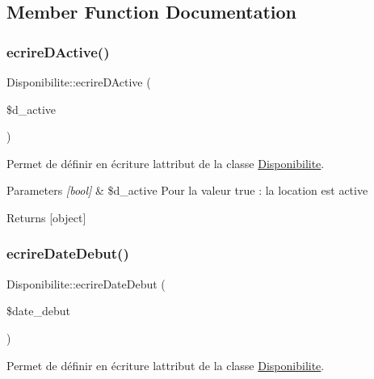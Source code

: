 \subsection{Member Function Documentation}
\mbox{\label{class_disponibilite_a8311a11dac8624c1682eb49aeaf37c07}} 
\subsubsection{\texorpdfstring{ecrire\+D\+Active()}{ecrireDActive()}}
{\footnotesize\ttfamily Disponibilite\+::ecrire\+D\+Active (\begin{DoxyParamCaption}\item[{}]{\$d\+\_\+active }\end{DoxyParamCaption})}



Permet de définir en écriture l\textquotesingle{}attribut de la classe \hyperlink{class_disponibilite}{Disponibilite}. 


\begin{DoxyParams}{Parameters}
{\em \mbox{[}bool\mbox{]}} & \$d\+\_\+active Pour la valeur true \+: la location est active \\
\hline
\end{DoxyParams}
\begin{DoxyReturn}{Returns}
\mbox{[}object\mbox{]} 
\end{DoxyReturn}
\mbox{\label{class_disponibilite_a68f38dbdb90bafa297624bfd21a8a383}} 
\subsubsection{\texorpdfstring{ecrire\+Date\+Debut()}{ecrireDateDebut()}}
{\footnotesize\ttfamily Disponibilite\+::ecrire\+Date\+Debut (\begin{DoxyParamCaption}\item[{}]{\$date\+\_\+debut }\end{DoxyParamCaption})}



Permet de définir en écriture l\textquotesingle{}attribut de la classe \hyperlink{class_disponibilite}{Disponibilite}. 


